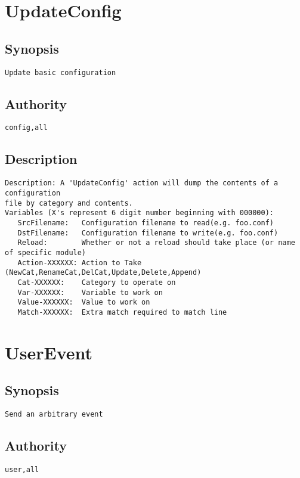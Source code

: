 \section{UpdateConfig}
\subsection{Synopsis}
\begin{verbatim}
Update basic configuration
\end{verbatim}
\subsection{Authority}
\begin{verbatim}
config,all
\end{verbatim}
\subsection{Description}
\begin{verbatim}
Description: A 'UpdateConfig' action will dump the contents of a configuration
file by category and contents.
Variables (X's represent 6 digit number beginning with 000000):
   SrcFilename:   Configuration filename to read(e.g. foo.conf)
   DstFilename:   Configuration filename to write(e.g. foo.conf)
   Reload:        Whether or not a reload should take place (or name of specific module)
   Action-XXXXXX: Action to Take (NewCat,RenameCat,DelCat,Update,Delete,Append)
   Cat-XXXXXX:    Category to operate on
   Var-XXXXXX:    Variable to work on
   Value-XXXXXX:  Value to work on
   Match-XXXXXX:  Extra match required to match line

\end{verbatim}


\section{UserEvent}
\subsection{Synopsis}
\begin{verbatim}
Send an arbitrary event
\end{verbatim}
\subsection{Authority}
\begin{verbatim}
user,all
\end{verbatim}
